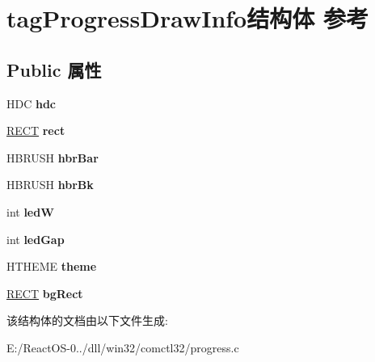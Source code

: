 \hypertarget{structtag_progress_draw_info}{}\section{tag\+Progress\+Draw\+Info结构体 参考}
\label{structtag_progress_draw_info}
\subsection*{Public 属性}
\begin{DoxyCompactItemize}
\item 
\mbox{\label{structtag_progress_draw_info_a32b0e2a5461e8876ee2919e9ae68def3}} 
H\+DC {\bfseries hdc}
\item 
\mbox{\label{structtag_progress_draw_info_aab85990772372dd883f4ad5d6fa2ddf3}} 
\hyperlink{structtag_r_e_c_t}{R\+E\+CT} {\bfseries rect}
\item 
\mbox{\label{structtag_progress_draw_info_a300c414c744da62240e7e15d2444d3ad}} 
H\+B\+R\+U\+SH {\bfseries hbr\+Bar}
\item 
\mbox{\label{structtag_progress_draw_info_a92665978cc2797d9c0736421d8c297d7}} 
H\+B\+R\+U\+SH {\bfseries hbr\+Bk}
\item 
\mbox{\label{structtag_progress_draw_info_af17414ea08877443f98e074b66cc64d0}} 
int {\bfseries ledW}
\item 
\mbox{\label{structtag_progress_draw_info_a54392c94b4eb54f2d152254e3b870e57}} 
int {\bfseries led\+Gap}
\item 
\mbox{\label{structtag_progress_draw_info_ab37c3accf4c13d15997ef84bcbe54d29}} 
H\+T\+H\+E\+ME {\bfseries theme}
\item 
\mbox{\label{structtag_progress_draw_info_a91dbaff58047748cf71ab8320ee41de5}} 
\hyperlink{structtag_r_e_c_t}{R\+E\+CT} {\bfseries bg\+Rect}
\end{DoxyCompactItemize}


该结构体的文档由以下文件生成\+:\begin{DoxyCompactItemize}
\item 
E\+:/\+React\+O\+S-\/0../dll/win32/comctl32/progress.\+c\end{DoxyCompactItemize}
